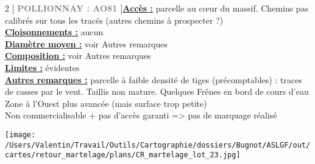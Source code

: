 \documentclass[a4paper,openany]{book}\usepackage[]{graphicx}\usepackage[]{color}
\begin{document}
\begin{multicols}{2}
[
\textbf{\textcolor{gray}{
\large POLLIONNAY : AO81
}}
]\noindent\textbf{\underline{Accès :}} parcelle au c\oe ur du massif. Chemins pas calibrés sur tous les tracés (autres chemins à prospecter ?)\vspace{0.1cm} \\\noindent\textbf{\underline{Cloisonnements :}} aucun\vspace{0.1cm} \\\noindent\textbf{\underline{Diamètre moyen :}} voir Autres remarques\vspace{0.1cm} \\\noindent\textbf{\underline{Composition :}} voir Autres remarques\vspace{0.1cm} \\\noindent\textbf{\underline{Limites :}} évidentes\vspace{0.1cm} \\\noindent\textbf{\underline{Autres remarques :}} parcelle à faible densité de tiges (précomptables) : traces de casses par le vent. Taillis non mature. Quelques Frênes en bord de cours d'eau \\Zone à l'Ouest plus avancée (mais surface trop petite) \\ Non commercialisable + pas d'accès garanti => pas de marquage réalisé\vspace{0.1cm} \\\end{multicols}\begin{center}
\texttt{[image: /Users/Valentin/Travail/Outils/Cartographie/dossiers/Bugnot/ASLGF/out/cartes/retour\_martelage/plans/CR\_martelage\_lot\_23.jpg]}
\end{center}\newpage
\end{document}
